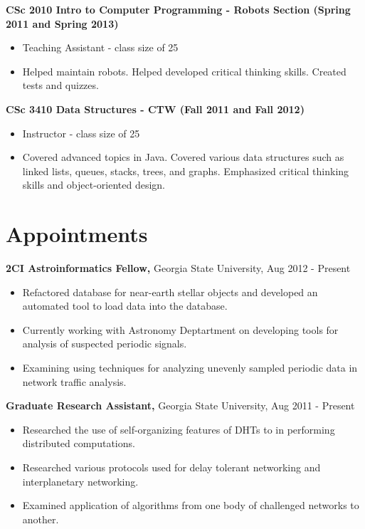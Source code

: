 \documentclass{res}
\begin{document}
\begin{resume}
{\bf CSc 2010 Intro to Computer Programming - Robots Section (Spring 2011 and Spring 2013) }
    \begin{itemize}
      \item Teaching Assistant - class size of 25
      \item Helped maintain robots.  Helped developed critical thinking skills.  Created tests and quizzes.
    \end{itemize}


{\bf CSc 3410 Data Structures  - CTW (Fall 2011 and  Fall 2012) }
    \begin{itemize}
    \item Instructor - class size of 25
      \item Covered advanced topics in Java.  Covered various data structures such as linked lists, queues, stacks, trees, and graphs.  Emphasized critical thinking skills and object-oriented design.
    \end{itemize}





\section{Appointments}

{\bf 2CI Astroinformatics Fellow,} Georgia State University, Aug 2012 - Present
     \begin{itemize}
     \item Refactored database for near-earth stellar objects and developed an automated tool to load data into the database.
     \item Currently working with Astronomy Deptartment on developing tools for analysis of suspected periodic signals.
     \item Examining using techniques for analyzing unevenly sampled periodic data in network traffic analysis.
     \end{itemize}   


{\bf Graduate Research Assistant,} Georgia State University, Aug 2011 - Present
     \begin{itemize}
     \item Researched the use of self-organizing features of DHTs to in performing distributed computations.
     \item Researched various protocols used for delay tolerant networking and interplanetary networking.
     \item Examined application of algorithms from one body of challenged networks to another.
  

\end{itemize}
\end{resume}
\end{document}

